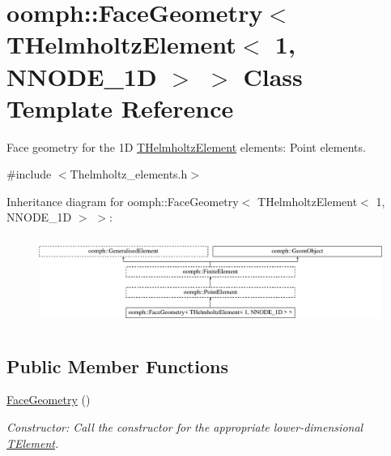 \hypertarget{classoomph_1_1FaceGeometry_3_01THelmholtzElement_3_011_00_01NNODE__1D_01_4_01_4}{}\section{oomph\+:\+:Face\+Geometry$<$ T\+Helmholtz\+Element$<$ 1, N\+N\+O\+D\+E\+\_\+1D $>$ $>$ Class Template Reference}
\label{classoomph_1_1FaceGeometry_3_01THelmholtzElement_3_011_00_01NNODE__1D_01_4_01_4}


Face geometry for the 1D \hyperlink{classoomph_1_1THelmholtzElement}{T\+Helmholtz\+Element} elements\+: Point elements.  




{\ttfamily \#include $<$Thelmholtz\+\_\+elements.\+h$>$}

Inheritance diagram for oomph\+:\+:Face\+Geometry$<$ T\+Helmholtz\+Element$<$ 1, N\+N\+O\+D\+E\+\_\+1D $>$ $>$\+:\begin{figure}[H]
\begin{center}
\leavevmode
\includegraphics[height=2.924282cm]{classoomph_1_1FaceGeometry_3_01THelmholtzElement_3_011_00_01NNODE__1D_01_4_01_4}
\end{center}
\end{figure}
\subsection*{Public Member Functions}
\begin{DoxyCompactItemize}
\item 
\hyperlink{classoomph_1_1FaceGeometry_3_01THelmholtzElement_3_011_00_01NNODE__1D_01_4_01_4_abc9da703507aa71a5dd01c16adad9cb5}{Face\+Geometry} ()
\begin{DoxyCompactList}\small\item\em Constructor\+: Call the constructor for the appropriate lower-\/dimensional \hyperlink{classoomph_1_1TElement}{T\+Element}. \end{DoxyCompactList}\end{DoxyCompactItemize}

